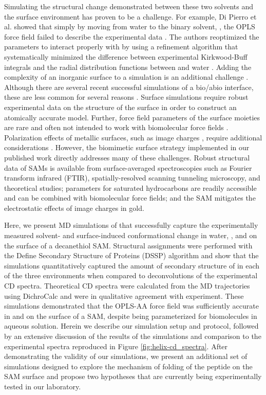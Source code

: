 Simulating the structural change demonstrated between these two solvents and the surface environment has proven to be a challenge. 
For example, Di Pierro et al. showed that simply by moving from water to the binary solvent, \tbawat{}, the OPLS force field failed to describe the experimental data \cite{DiPierro2015}.   
The authors reoptimized the \tba{} parameters to interact properly with  by using a refinement algorithm that systematically minimized the difference between experimental Kirkwood-Buff integrals and the radial distribution functions between \tba{} and water \cite{DiPierro2015}. 
Adding the complexity of an inorganic surface to a simulation is an additional challenge \cite{Walsh2017}. 
Although there are several recent successful simulations of a bio/abio interface, these are less common for several reasons \cite{Gianese2009, Meibner2014, Zerze2015, Cannon2015, Krause2017, Prakash2018a, Prakash2018, Sprenger2018}.
Surface simulations require robust experimental data on the structure of the surface in order to construct an atomically accurate model. 
Further, force field parameters of the surface moieties are rare and often not intended to work with biomolecular force fields \cite{Latour2008, Latour2014}.
Polarization effects of metallic surfaces, such as image charges \cite{Heinz2011}, require additional considerations \cite{Iori2009}. 
However, the biomimetic surface strategy implemented in our published work directly addresses many of these challenges. 
Robust structural data of SAMs is available from surface-averaged spectroscopies such as Fourier transform infrared (FTIR), spatially-resolved scanning tunneling microscopy, and theoretical studies; 
parameters for saturated hydrocarbons are readily accessible and can be combined with biomolecular force fields; 
and the SAM mitigates the electrostatic effects of image charges in gold.

Here, we present MD simulations of \pep{} that successfully capture the experimentally measured solvent- and surface-induced conformational change in water, \tbawat{}, and on the surface of a decanethiol SAM. 
Structural assignments were performed with the Define Secondary Structure of Proteins (DSSP) algorithm and show that the simulations quantitatively captured the amount of secondary structure of \pep{} in each of the three environments when compared to deconvolutions of the experimental CD spectra. 
Theoretical CD spectra were calculated from the MD trajectories using DichroCalc and were in qualitative agreement with experiment. 
These simulations demonstrated that the OPLS-AA force field was sufficiently accurate in \tbawat{} and on the surface of a SAM, despite being parameterized for biomolecules in aqueous solution. 
Herein we describe our simulation setup and protocol, followed by an extensive discussion of the results of the simulations and comparison to the experimental spectra\cite{Gallardo2012} reproduced in Figure \ref{fig:helix-cd_spectra}. 
After demonstrating the validity of our simulations, we present an additional set of simulations designed to explore the mechanism of folding of the peptide on the SAM surface and propose two hypotheses that are currently being experimentally tested in our laboratory.

